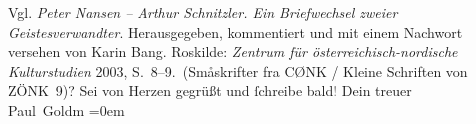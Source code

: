 \begin{ledgroupsized}[t]{13cm}
{{{                     Vgl. \emph{Peter Nansen – Arthur Schnitzler. Ein Briefwechsel
                        zweier Geistesverwandter}. Herausgegeben, kommentiert und mit einem
                     Nachwort versehen von Karin Bang. Roskilde:
                        \emph{Zentrum für österreichisch-nordische Kulturstudien}{ }2003, S. 8–9. (Småskrifter fra CØNK / Kleine Schriften
                     von ZÖNK 9)}}}\label{K_L02806-4h}?\pend
           \pstart
           Sei von Herzen gegrüßt und ſchreibe bald\textcolor{gray}{!}\pend
           \pstart
           Dein treuer {\\[\baselineskip]}\spacefill\mbox{Paul Goldm}\pend
           \leftskip=0em{}
         
         \endnumbering{}\end{ledgroupsized}  \newcommand{\dateiname}{L02806}\newcommand{\titel}{Paul Goldmann an Arthur Schnitzler, 22. 3. [1897]}\newcommand{\editorInnen}{Martin Anton Müller und Laura Untner}
      